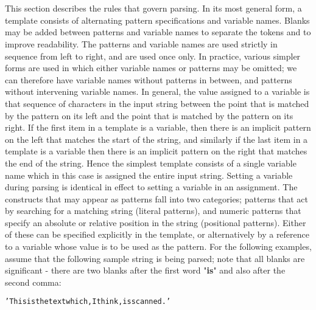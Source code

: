 \section{}\label{}
 This section describes the rules that govern parsing.
 In its most general form, a template consists of alternating pattern
specifications and variable names.  Blanks may be added between
patterns and variable names to separate the tokens and to improve
readability.  The patterns and variable names are used strictly in
sequence from left to right, and are used once only.  In practice,
various simpler forms are used in which either variable names or
patterns may be omitted; we can therefore have variable names without
patterns in between, and patterns without intervening variable names.
 In general, the value assigned to a variable is that sequence of
characters in the input string between the point that is matched by the
pattern on its left and the point that is matched by the pattern on its
right.
 If the first item in a template is a variable, then there is an
implicit pattern on the left that matches the start of the string, and
similarly if the last item in a template is a variable then there is an
implicit pattern on the right that matches the end of the string.
Hence the simplest template consists of a single variable name which in
this case is assigned the entire input string.
 Setting a variable during parsing is identical in effect to setting a
variable in an assignment.
 The constructs that may appear as patterns fall into two categories;
patterns that act by searching for a matching string (literal
patterns), and numeric patterns that specify an absolute or relative
position in the string (positional patterns).
Either of these can be specified explicitly in the template, or
alternatively by a reference to a variable whose value is to be used
as the pattern.
 For the following examples, assume that the following sample string
is being parsed; note that all blanks are significant - there are
two blanks after the first word "\textbf{is}" and also after the
second comma:
\begin{alltt}
'This is  the text which, I think,  is scanned.'
\end{alltt}
